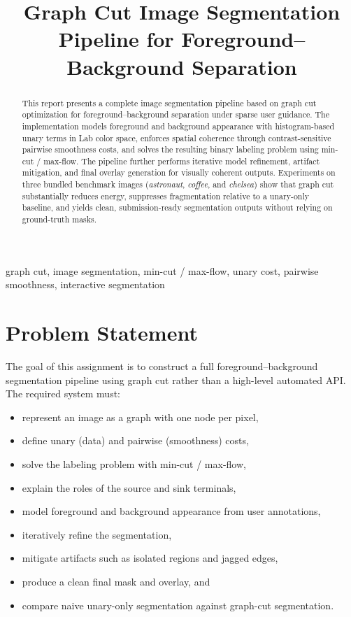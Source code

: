 \documentclass[conference]{IEEEtran}
\title{Graph Cut Image Segmentation Pipeline for Foreground--Background Separation}
\author{
  \IEEEauthorblockN{Madhav Kataria}
  \IEEEauthorblockA{
    Roll No: B23CH1025 \\
    Computer Vision Assignment 2
  }
}
\begin{document}
\maketitle

\begin{abstract}
This report presents a complete image segmentation pipeline based on graph cut optimization for foreground--background separation under sparse user guidance. The implementation models foreground and background appearance with histogram-based unary terms in Lab color space, enforces spatial coherence through contrast-sensitive pairwise smoothness costs, and solves the resulting binary labeling problem using min-cut / max-flow. The pipeline further performs iterative model refinement, artifact mitigation, and final overlay generation for visually coherent outputs. Experiments on three bundled benchmark images (\textit{astronaut}, \textit{coffee}, and \textit{chelsea}) show that graph cut substantially reduces energy, suppresses fragmentation relative to a unary-only baseline, and yields clean, submission-ready segmentation outputs without relying on ground-truth masks.
\end{abstract}

\begin{IEEEkeywords}
graph cut, image segmentation, min-cut / max-flow, unary cost, pairwise smoothness, interactive segmentation
\end{IEEEkeywords}

\section{Problem Statement}
The goal of this assignment is to construct a full foreground--background segmentation pipeline using graph cut rather than a high-level automated API. The required system must:
\begin{itemize}
  \item represent an image as a graph with one node per pixel,
  \item define unary (data) and pairwise (smoothness) costs,
  \item solve the labeling problem with min-cut / max-flow,
  \item explain the roles of the source and sink terminals,
  \item model foreground and background appearance from user annotations,
  \item iteratively refine the segmentation,
  \item mitigate artifacts such as isolated regions and jagged edges,
  \item produce a clean final mask and overlay, and
  \item compare naive unary-only segmentation against graph-cut segmentation.
\end{itemize}
\end{document}
